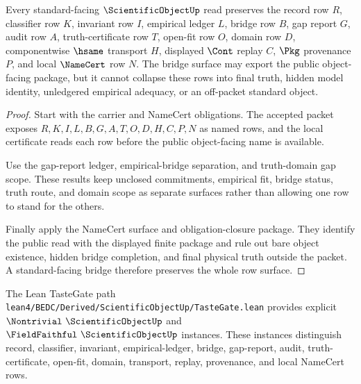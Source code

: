 \begin{theorem}
\label{thm:scientific-object-standard-bridge-surface}
Every standard-facing $\ScientificObjectUp$ read preserves the record row $R$, classifier row $K$, invariant row $I$, empirical ledger $L$, bridge row $B$, gap report $G$, audit row $A$, truth-certificate row $T$, open-fit row $O$, domain row $D$, componentwise $\hsame$ transport $H$, displayed $\Cont$ replay $C$, $\Pkg$ provenance $P$, and local $\NameCert$ row $N$. The bridge surface may export the public object-facing package, but it cannot collapse these rows into final truth, hidden model identity, unledgered empirical adequacy, or an off-packet standard object.
\end{theorem}
\begin{proof}
Start with the carrier and NameCert obligations. The accepted packet exposes $R,K,I,L,B,G,A,T,O,D,H,C,P,N$ as named rows, and the local certificate reads each row before the public object-facing name is available.

Use the gap-report ledger, empirical-bridge separation, and truth-domain gap scope. These results keep unclosed commitments, empirical fit, bridge status, truth route, and domain scope as separate surfaces rather than allowing one row to stand for the others.

Finally apply the NameCert surface and obligation-closure package. They identify the public read with the displayed finite package and rule out bare object existence, hidden bridge completion, and final physical truth outside the packet. A standard-facing bridge therefore preserves the whole row surface.
\end{proof}



The Lean TasteGate path \texttt{lean4/BEDC/Derived/ScientificObjectUp/TasteGate.lean} provides explicit $\Nontrivial\ \ScientificObjectUp$ and $\FieldFaithful\ \ScientificObjectUp$ instances. These instances distinguish record, classifier, invariant, empirical-ledger, bridge, gap-report, audit, truth-certificate, open-fit, domain, transport, replay, provenance, and local NameCert rows.

